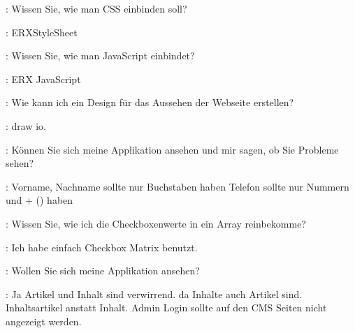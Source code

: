 \documentclass[a4paper, 11pt]{article}
\begin{document}
\begin{drama}
\msspeaks: Wissen Sie, wie man CSS einbinden soll?

\lucasspeaks: ERXStyleSheet

\msspeaks: Wissen Sie, wie man JavaScript einbindet?

\lucasspeaks: ERX JavaScript

\msspeaks: Wie kann ich ein Design für das Aussehen der Webseite erstellen?

\lucasspeaks: draw io.

\msspeaks: Können Sie sich meine Applikation ansehen und mir sagen, ob Sie Probleme sehen?

\lucasspeaks:
    Vorname, Nachname sollte nur Buchstaben haben
    Telefon sollte nur Nummern und + () haben

\msspeaks: Wissen Sie, wie ich die Checkboxenwerte in ein Array reinbekomme?

\standhardspeaks: Ich habe einfach Checkbox Matrix benutzt.

\msspeaks: Wollen Sie sich meine Applikation ansehen?

\fuscospeaks: Ja
    Artikel und Inhalt sind verwirrend. da Inhalte auch Artikel sind. Inhaltsartikel anstatt Inhalt.
    Admin Login sollte auf den CMS Seiten nicht angezeigt werden.

\end{drama}
\end{document}
